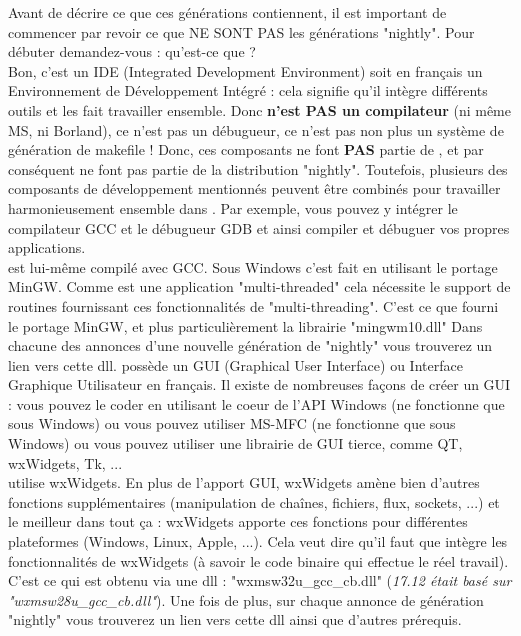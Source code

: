 Avant de décrire ce que ces générations contiennent, il est important de commencer par revoir ce que NE SONT PAS les générations "nightly". Pour débuter demandez-vous : qu'est-ce que \codeblocks ?\\
Bon, c'est un IDE (Integrated Development Environment) soit en français un Environnement de Développement Intégré : cela signifie qu'il intègre différents outils et les fait travailler ensemble. Donc \codeblocks \textbf{n'est PAS un compilateur} (ni même MS, ni Borland), ce n'est pas un débugueur, ce n'est pas non plus un système de génération de makefile ! Donc, ces composants ne font \textbf{PAS} partie de \codeblocks, et par conséquent ne font pas partie de la distribution "nightly". Toutefois, plusieurs des composants de développement mentionnés peuvent être combinés pour travailler harmonieusement ensemble dans \codeblocks. Par exemple, vous pouvez y intégrer le compilateur GCC et le débugueur GDB et ainsi compiler et débuguer vos propres applications.\\
\codeblocks est lui-même compilé avec GCC. Sous Windows c'est fait en utilisant le portage MinGW. Comme \codeblocks est une application "multi-threaded" cela nécessite le support de routines fournissant ces fonctionnalités de "multi-threading". C'est ce que fourni le portage MinGW, et plus particulièrement la librairie "mingwm10.dll" Dans chacune des annonces d'une nouvelle génération de "nightly" vous trouverez un lien vers cette dll.
\codeblocks possède un GUI (Graphical User Interface) ou Interface Graphique Utilisateur en français. Il existe de nombreuses façons de créer un GUI : vous pouvez le coder en utilisant le coeur de l'API Windows (ne fonctionne que sous Windows) ou vous pouvez utiliser MS-MFC (ne fonctionne que sous Windows) ou vous pouvez utiliser une librairie de GUI tierce, comme QT, wxWidgets, Tk, ...\\
\codeblocks utilise wxWidgets. En plus de l'apport GUI, wxWidgets amène bien d'autres fonctions supplémentaires (manipulation de chaînes, fichiers, flux, sockets, ...) et le meilleur dans tout ça : wxWidgets apporte ces fonctions pour différentes plateformes (Windows, Linux, Apple, ...). Cela veut dire qu'il faut que \codeblocks intègre les fonctionnalités de wxWidgets (à savoir le code binaire qui effectue le réel travail). C'est ce qui est obtenu via une dll : "wxmsw32u\_gcc\_cb.dll" (\textit{17.12 était basé sur "wxmsw28u\_gcc\_cb.dll"}). Une fois de plus, sur chaque annonce de génération "nightly" vous trouverez un lien vers cette dll ainsi que d'autres prérequis.

